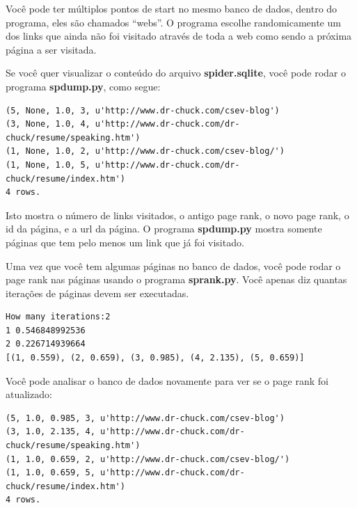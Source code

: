 Você pode ter múltiplos pontos de start no mesmo banco de dados, dentro
do programa, eles são chamados ``webs''. O programa escolhe randomicamente
um dos links que ainda não foi visitado através de toda a web como sendo
a próxima página a ser visitada.

Se você quer visualizar o conteúdo do arquivo {\bf spider.sqlite}, você pode
rodar o programa {\bf spdump.py}, como segue:

\beforeverb
\begin{verbatim}
(5, None, 1.0, 3, u'http://www.dr-chuck.com/csev-blog')
(3, None, 1.0, 4, u'http://www.dr-chuck.com/dr-chuck/resume/speaking.htm')
(1, None, 1.0, 2, u'http://www.dr-chuck.com/csev-blog/')
(1, None, 1.0, 5, u'http://www.dr-chuck.com/dr-chuck/resume/index.htm')
4 rows.
\end{verbatim}
\afterverb
%

Isto mostra o número de links visitados, o antigo page rank, o novo page
rank, o id da página, e a url da página. O programa {\bf spdump.py} mostra somente
páginas que tem pelo menos um link que já foi visitado.

Uma vez que você tem algumas páginas no banco de dados, você pode rodar o page 
rank nas páginas usando o programa {\bf sprank.py}. Você apenas diz quantas
iterações de páginas devem ser executadas.

\beforeverb
\begin{verbatim}
How many iterations:2
1 0.546848992536
2 0.226714939664
[(1, 0.559), (2, 0.659), (3, 0.985), (4, 2.135), (5, 0.659)]
\end{verbatim}
\afterverb
%
Você pode analisar o banco de dados novamente para ver se o page rank foi
atualizado:

\beforeverb
\begin{verbatim}
(5, 1.0, 0.985, 3, u'http://www.dr-chuck.com/csev-blog')
(3, 1.0, 2.135, 4, u'http://www.dr-chuck.com/dr-chuck/resume/speaking.htm')
(1, 1.0, 0.659, 2, u'http://www.dr-chuck.com/csev-blog/')
(1, 1.0, 0.659, 5, u'http://www.dr-chuck.com/dr-chuck/resume/index.htm')
4 rows.
\end{verbatim}
\afterverb
%

